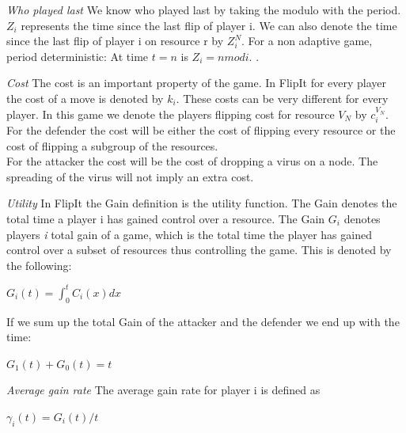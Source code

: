 \begin{description}
\item \textit{Who played last} We know who played last by taking the modulo with the period. $Z_{i}$ represents the time since the last flip of player i. We can also denote the time since the last flip of player i on resource r by $Z_{i}^{N}$. 
For a non adaptive game, period deterministic: At time $t=n$ is $Z_{i} = n mod i$.  .


\item \textit{Cost} The cost is an important property of the game. In FlipIt for every player the cost of a move is denoted by $k_{i}$. These costs can be very different for every player. In this game we denote the players flipping cost for resource $V_{N}$ by $c_{i}^{V_{N}}$. \\
For the defender the cost will be either the cost of flipping every resource or the cost of flipping a subgroup of the resources.\\
For the attacker the cost will be the cost of dropping a virus on a node. The spreading of the virus will not imply an extra cost. 

\item \textit{Utility} In FlipIt the Gain definition is the utility function. The Gain denotes the total time a player i has gained control over a resource. 
The Gain $G_{i}$ denotes players \textit{i} total gain of a game, which is the total time the player has gained control over a subset of resources thus controlling the game. This is denoted by the following:\\
\begin{center}
$G_{i}(t) = \int^{t}_{0} C_{i}(x) dx$ 
\end{center}
 If we sum up the total Gain of the attacker and the defender we end up with the time:
\begin{center}
$G_{1}(t) + G_{0}(t) = t$
\end{center}

\item \textit{Average gain rate} The average gain rate for player i is defined as
\begin{center}
$\gamma_{i}(t)= G_{i}(t)/t$
\end{center}


\end{description}
